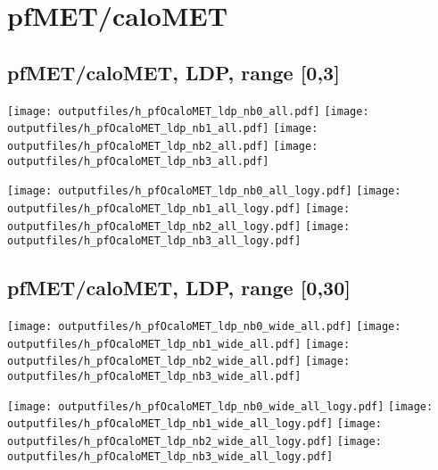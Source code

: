 \documentclass[11pt]{article}
\begin{document}
   \section{ pfMET/caloMET}

    \subsection{ pfMET/caloMET, LDP, range [0,3]}

    \noindent
     \texttt{[image: outputfiles/h\_pfOcaloMET\_ldp\_nb0\_all.pdf]}
     \texttt{[image: outputfiles/h\_pfOcaloMET\_ldp\_nb1\_all.pdf]}
     \texttt{[image: outputfiles/h\_pfOcaloMET\_ldp\_nb2\_all.pdf]}
     \texttt{[image: outputfiles/h\_pfOcaloMET\_ldp\_nb3\_all.pdf]}

    \noindent
     \texttt{[image: outputfiles/h\_pfOcaloMET\_ldp\_nb0\_all\_logy.pdf]}
     \texttt{[image: outputfiles/h\_pfOcaloMET\_ldp\_nb1\_all\_logy.pdf]}
     \texttt{[image: outputfiles/h\_pfOcaloMET\_ldp\_nb2\_all\_logy.pdf]}
     \texttt{[image: outputfiles/h\_pfOcaloMET\_ldp\_nb3\_all\_logy.pdf]}

    \clearpage



    \subsection{ pfMET/caloMET, LDP, range [0,30]}

    \noindent
     \texttt{[image: outputfiles/h\_pfOcaloMET\_ldp\_nb0\_wide\_all.pdf]}
     \texttt{[image: outputfiles/h\_pfOcaloMET\_ldp\_nb1\_wide\_all.pdf]}
     \texttt{[image: outputfiles/h\_pfOcaloMET\_ldp\_nb2\_wide\_all.pdf]}
     \texttt{[image: outputfiles/h\_pfOcaloMET\_ldp\_nb3\_wide\_all.pdf]}

    \noindent
     \texttt{[image: outputfiles/h\_pfOcaloMET\_ldp\_nb0\_wide\_all\_logy.pdf]}
     \texttt{[image: outputfiles/h\_pfOcaloMET\_ldp\_nb1\_wide\_all\_logy.pdf]}
     \texttt{[image: outputfiles/h\_pfOcaloMET\_ldp\_nb2\_wide\_all\_logy.pdf]}
     \texttt{[image: outputfiles/h\_pfOcaloMET\_ldp\_nb3\_wide\_all\_logy.pdf]}
\end{document}
